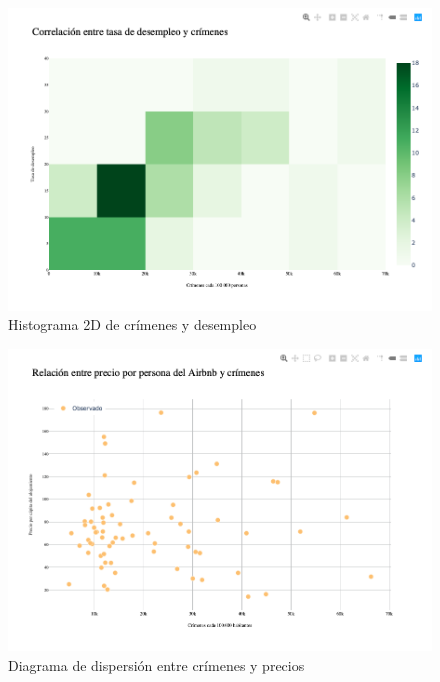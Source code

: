 \documentclass[12pt]{article}
\begin{document}
\begin{figure}
    \centering
    \includegraphics[width = \textwidth]{mapas/Chicago_Corr_CrimenesUnemp.png}   
    \caption{Histograma 2D de crímenes y desempleo}
    \label{hist2dcrimunep}
\end{figure}

\begin{figure}
    \centering
    \includegraphics[width = \textwidth]{mapas/Chicago_Scatter_PrecioCrimenes.png}   
    \caption{Diagrama de dispersi\'on entre cr\'imenes y precios}
    \label{scatterpreciocrimen}
\end{figure}
\end{document}
